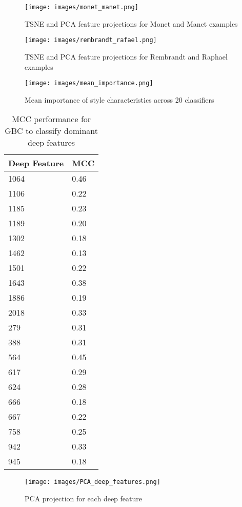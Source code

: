 \documentclass{article}
\begin{document}
\begin{figure}[h!]
    \centering
    \texttt{[image: images/monet\_manet.png]}
    \caption{TSNE and PCA feature projections for Monet and Manet examples}
    \label{F:1}
\end{figure}


\begin{figure}[h!]
    \centering
    \texttt{[image: images/rembrandt\_rafael.png]}
    \caption{TSNE and PCA feature projections for Rembrandt and Raphael examples}
    \label{F:1}
\end{figure}


\begin{figure}[h!]
    \centering
    \texttt{[image: images/mean\_importance.png]}
    \caption{Mean importance of style characteristics across 20 classifiers}
    \label{F:1}
\end{figure}


\begin{table}[]
\centering
\begin{tabular}{|l|l|}
\hline
\multicolumn{1}{|c|}{Deep Feature} & MCC \\ \hline
1064 & 0.46 \\ \hline
1106 & 0.22 \\ \hline
1185 & 0.23 \\ \hline
1189 & 0.20 \\ \hline
1302 & 0.18 \\ \hline
1462 & 0.13 \\ \hline
1501 & 0.22 \\ \hline
1643 & 0.38 \\ \hline
1886 & 0.19 \\ \hline
2018 & 0.33 \\ \hline
279 & 0.31 \\ \hline
388 & 0.31 \\ \hline
564 & 0.45 \\ \hline
617 & 0.29 \\ \hline
624 & 0.28 \\ \hline
666 & 0.18 \\ \hline
667 & 0.22 \\ \hline
758 & 0.25 \\ \hline
942 & 0.33 \\ \hline
945 & 0.18 \\ \hline
\end{tabular}
\caption{MCC performance for GBC to classify dominant deep features}
\label{tab:my-table}
\end{table}

\begin{figure}[]
    \centering
    \texttt{[image: images/PCA\_deep\_features.png]}
    \caption{PCA projection for each deep feature}
    \label{F:1}
\end{figure}
\end{document}
